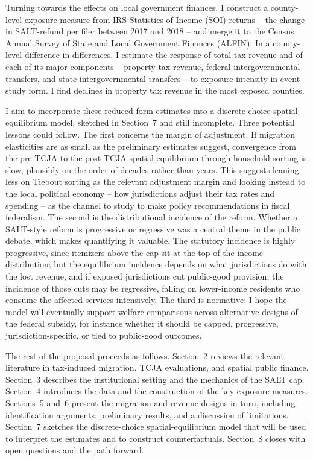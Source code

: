 \documentclass[12pt]{article}
\begin{document}
Turning towards the effects on local government finances, I construct a county-level exposure measure from IRS Statistics of Income (SOI) returns -- the change in SALT-refund per filer between 2017 and 2018 -- and merge it to the Census Annual Survey of State and Local Government Finances (ALFIN). In a county-level difference-in-differences, I estimate the response of total tax revenue and of each of its major components -- property tax revenue, federal intergovernmental transfers, and state intergovernmental transfers -- to exposure intensity in event-study form. I find declines in property tax revenue in the most exposed counties.

I aim to incorporate these reduced-form estimates into a discrete-choice spatial-equilibrium model, sketched in Section~7 and still incomplete. Three potential lessons could follow. The first concerns the margin of adjustment. If migration elasticities are as small as the preliminary estimates suggest, convergence from the pre-TCJA to the post-TCJA spatial equilibrium through household sorting is slow, plausibly on the order of decades rather than years. This suggests leaning less on Tiebout sorting as the relevant adjustment margin and looking instead to the local political economy -- how jurisdictions adjust their tax rates and spending -- as the channel to study to make policy recommendations in fiscal federalism. The second is the distributional incidence of the reform. Whether a SALT-style reform is progressive or regressive was a central theme in the public debate, which makes quantifying it valuable. The statutory incidence is highly progressive, since itemizers above the cap sit at the top of the income distribution; but the equilibrium incidence depends on what jurisdictions do with the lost revenue, and if exposed jurisdictions cut public-good provision, the incidence of those cuts may be regressive, falling on lower-income residents who consume the affected services intensively. The third is normative: I hope the model will eventually support welfare comparisons across alternative designs of the federal subsidy, for instance whether it should be capped, progressive, jurisdiction-specific, or tied to public-good outcomes.

The rest of the proposal proceeds as follows. Section~2 reviews the relevant literature in tax-induced migration, TCJA evaluations, and spatial public finance. Section~3 describes the institutional setting and the mechanics of the SALT cap. Section~4 introduces the data and the construction of the key exposure measures. Sections~5 and~6 present the migration and revenue designs in turn, including identification arguments, preliminary results, and a discussion of limitations. Section~7 sketches the discrete-choice spatial-equilibrium model that will be used to interpret the estimates and to construct counterfactuals. Section~8 closes with open questions and the path forward.
\end{document}
